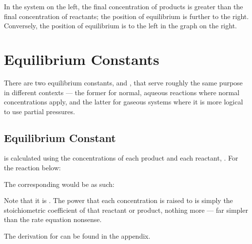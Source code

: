 			In the system on the left, the final concentration of products is greater than the final concentration of reactants;
			 the position of equilibrium is further to the right. Conversely, the position of equilibrium is to the left
			in the graph on the right.





	\pagebreak
	\section{Equilibrium Constants}

		There are two equilibrium constants, \Kc{} and \Kp{}, that serve roughly the same purpose in different contexts --- the former for normal,
		aqueous reactions where normal concentrations apply, and the latter for gaseous systems where it is more logical to use partial pressures.

		\subsection{Equilibrium Constant \texorpdfstring{\Kc{}}{Kc}}

			\Kc{} is calculated using the concentrations of each product and each reactant, . For the reaction below:


			The corresponding \Kc{} would be as such:

			\mathdiagram{
				\[ \MKc = \frac{[\ch{C}]^{c}[\ch{D}]^{d}}{[\ch{A}]^{a}[\ch{B}]^{b}} \]
			}

			Note that it is . The power that each concentration is raised to is simply the stoichiometric
			coefficient of that reactant or product, nothing more --- far simpler than the rate equation nonsense.

			The derivation for \Kc{} can be found in the appendix.



